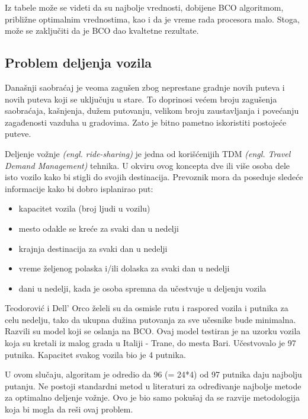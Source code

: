 \documentclass[a4paper]{article}
\begin{document}
{\begin{center}
\end{center}
Iz tabele može se videti da su najbolje vrednosti, dobijene BCO algoritmom, približne optimalnim vrednostima, kao i da je vreme rada procesora malo. Stoga, može se zaključiti da je BCO dao kvaltetne rezultate.

\subsection{Problem deljenja vozila}
\label{subsec:drugaprimena}
Današnji saobraćaj je veoma zagušen zbog neprestane gradnje novih puteva i novih puteva koji se uključuju u stare. To doprinosi većem broju zagušenja saobraćaja, kašnjenja, dužem putovanju, velikom broju zaustavljanja i povećanju zagađenosti vazduha u gradovima. Zato je bitno pametno iskoristiti postojeće puteve. 

Deljenje vožnje {\em(engl. ride-sharing)} je jedna od korišćenijih TDM {\em (engl. Travel Demand Management)} tehnika. U okviru ovog koncepta dve ili više osoba dele isto vozilo kako bi stigli do svojih destinacija. Prevoznik mora da poseduje sledeće informacije kako bi dobro isplanirao put:
\begin{itemize}%
\setlength{\labelsep}{10pt}
       \item kapacitet vozila (broj ljudi u vozilu)
       \item mesto odakle se kreće za svaki dan u nedelji
       \item krajnja destinacija za svaki dan u nedelji
       \item vreme željenog polaska i/ili dolaska za svaki dan u nedelji
       \item dani u nedelji, kada je osoba spremna da učestvuje u deljenju vozila 
\end{itemize}

Teodorović i Dell’ Orco želeli su da osmisle rutu i raspored vozila i putnika za celu nedelju, tako da ukupna dužina putovanja za sve učesnike bude minimalna. Razvili su model koji se oslanja na BCO.
Ovaj model testiran je na uzorku vozila koja su kretali iz malog grada u Italiji - Trane, do mesta Bari. Učestvovalo je 97 putnika. Kapacitet svakog vozila bio je 4 putnika.

U ovom slučaju, algoritam je odredio da 96 (= 24*4) od 97 putnika daju najbolju putanju. Ne postoji standardni metod u literaturi za određivanje najbolje metode za optimalno deljenje vožnje. Ovo je bio samo pokušaj da se razvije metodologija koja bi mogla da reši ovaj problem\cite{voznja}.

}
\end{document}
